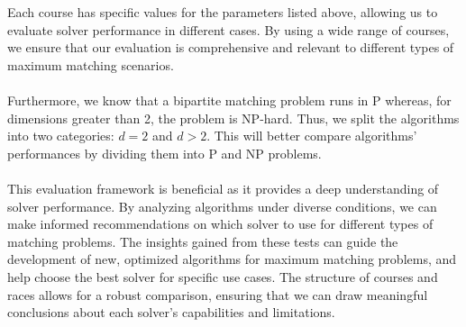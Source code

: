 Each course has specific values for the parameters listed above, allowing us to evaluate solver performance in different cases. By using a wide range of courses, we ensure that our evaluation is comprehensive and relevant to different types of maximum matching scenarios.\\
\\
Furthermore, we know that a bipartite matching problem runs in P whereas, for dimensions greater than 2, the problem is NP-hard. Thus, we split the algorithms into two categories: $d = 2$ and $d > 2$. This will better compare algorithms' performances by dividing them into P and NP problems.\\
\\
This evaluation framework is beneficial as it provides a deep understanding of solver performance. By analyzing algorithms under diverse conditions, we can make informed recommendations on which solver to use for different types of matching problems. The insights gained from these tests can guide the development of new, optimized algorithms for maximum matching problems, and help choose the best solver for specific use cases. The structure of courses and races allows for a robust comparison, ensuring that we can draw meaningful conclusions about each solver’s capabilities and limitations.